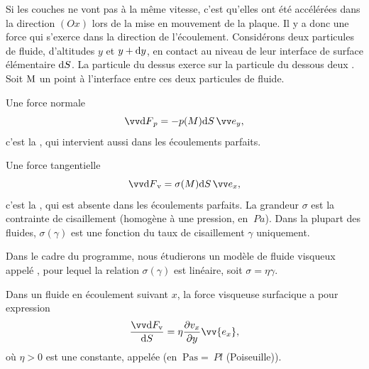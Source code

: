 \documentclass[12pt,fancy]{cours}
\begin{document}
Si les couches ne vont pas à la même vitesse, c'est qu'elles ont été accélérées dans la direction $(Ox)$ lors de la mise en mouvement de la plaque. Il y a donc une force qui s'exerce dans la direction de l'écoulement. Considérons deux particules de fluide, d'altitudes $y$ et $y+\mathrm{d} y$, en contact au niveau de leur interface de surface élémentaire $\mathrm{d} S$. La particule du dessus exerce sur la particule du dessous deux . Soit $\rm M$ un point à l'interface entre ces deux particules de fluide.
\begin{liste}
\item Une force normale 
$$
\Vec{\d F}_p = - p(M) \d S \,\ey,
$$ c’est la , qui intervient aussi dans les écoulements parfaits.
\item Une force tangentielle 
$$
\Vec{\d F}_{\rm v} = \sigma(M) \d S \,\ex,
$$
c’est la , qui est absente dans les écoulements parfaits. La grandeur $\sigma$ est la contrainte de cisaillement (homogène à une pression, en $\SI{}{Pa}$). Dans la plupart des fluides, $\sigma(\gamma)$ est une fonction du taux de cisaillement $\gamma$ uniquement.
\end{liste}
Dans le cadre du programme, nous étudierons un modèle de fluide visqueux appelé , pour lequel la relation $\sigma(\gamma)$ est linéaire, soit $\sigma = \eta \gamma.$


\begin{definition}\label{def:newt}
Dans un fluide  en écoulement suivant $x$, la force visqueuse surfacique a pour expression
\begin{equation*}
\frac{\Vec{\d F}_{\! \rm{v}}}{\d S}=\eta\dfrac{\partial v_{x}}{\partial y}\vv{e_{x}},
\end{equation*}
où $\eta > 0$ est une constante, appelée  (en $\SI{}{\pascal\second} = \SI{}{Pl}$ (Poiseuille)).
\end{definition}
\end{document}
